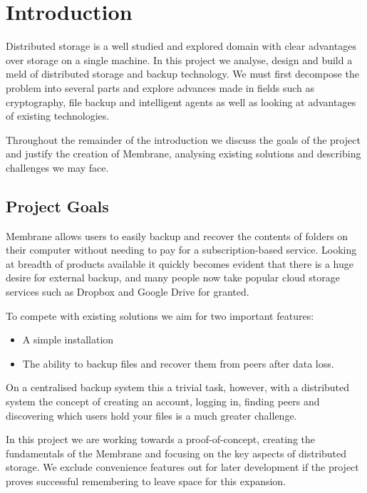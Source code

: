 \documentclass[11pt, a4paper, twoside]{report}
\begin{document}
\listoffigures

\chapter{Introduction}
Distributed storage is a well studied and explored domain with clear advantages over storage on a single machine. In this project we analyse, design and build a meld of distributed storage and backup technology. We must first decompose the problem into several parts and explore advances made in fields such as cryptography, file backup and intelligent agents as well as looking at advantages of existing technologies.

Throughout the remainder of the introduction we discuss the goals of the project and justify the creation of Membrane, analysing existing solutions and describing challenges we may face.

\section{Project Goals}

Membrane allows users to easily backup and recover the contents of folders on their computer without needing to pay for a subscription-based service. Looking at breadth of products available it quickly becomes evident that there is a huge desire for external backup, and many people now take popular cloud storage services such as Dropbox and Google Drive for granted. \citep{dropbox2015popularity}

To compete with existing solutions we aim for two important features: 

\begin{itemize}
 \item A simple installation
 \item The ability to backup files and recover them from peers after data loss.
\end{itemize}

On a centralised backup system this a trivial task, however, with a distributed system the concept of creating an account, logging in, finding peers and discovering which users hold your files is a much greater challenge.

In this project we are working towards a proof-of-concept, creating the fundamentals of the Membrane and focusing on the key aspects of distributed storage. We exclude convenience features out for later development if the project proves successful remembering to leave space for this expansion.
\end{document}
